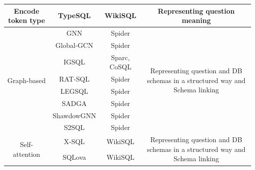 \begin{table}
\begin{tabular}{|c|c|c|c|}
        Encode token type               & TypeSQL             & WikiSQL                   & Representing question meaning                                                                              \\
        \hline
        \multirow{8}{*}{Graph-based}    & GNN                 & Spider                    & \multirow{8}{*}{\parbox{5cm}{Representing question and DB schemas in a structured way and Schema linking}} \\
                                        & Global-GCN          & Spider                    &                                                                                                            \\
                                        & IGSQL               & Sparc, CoSQL              &                                                                                                            \\
                                        & RAT-SQL             & Spider                    &                                                                                                            \\
                                        & LEGSQL              & Spider                    &                                                                                                            \\
                                        & SADGA               & Spider                    &                                                                                                            \\
                                        & ShawdowGNN          & Spider                    &                                                                                                            \\
                                        & S2SQL               & Spider                    &                                                                                                            \\
        \hline
        \multirow{5}{*}{Self-attention} & X-SQL               & WikiSQL                   & \multirow{5}{*}{\parbox{5cm}{Representing question and DB schemas in a structured way and Schema linking}} \\
                                        & SQLova              & WikiSQL                   &                                                                                                            \\

\end{tabular}
\end{table}
